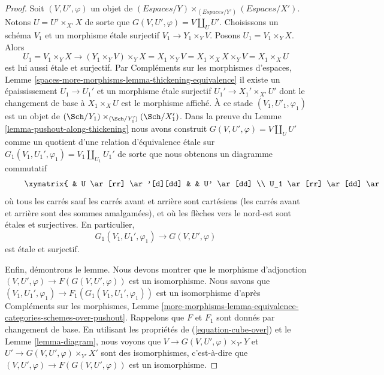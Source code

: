 \begin{proof}
\medskip\noindent
Soit $(V, U', \varphi)$ un objet de
$(\textit{Espaces}/Y) \times_{(\textit{Espaces}/Y')} (\textit{Espaces}/X')$.
Notons $U = U' \times_{X'} X$ de sorte que $G(V, U', \varphi) = V \amalg_U U'$.
Choisissons un schéma $V_1$ et un morphisme \'etale surjectif
$V_1 \to Y_1 \times_Y V$. Posons $U_1 = V_1 \times_Y X$. Alors
$$
U_1 = V_1 \times_Y X
\longrightarrow
(Y_1 \times_Y V) \times_Y X =
X_1 \times_Y V = X_1 \times_X X \times_Y V = X_1 \times_X U
$$
est lui aussi \'etale et surjectif. Par
Compléments sur les morphismes d'espaces, Lemme
\ref{spaces-more-morphisms-lemma-thickening-equivalence}
il existe un épaississement $U_1 \to U_1'$ et un morphisme \'etale surjectif
$U_1' \to X_1' \times_{X'} U'$ dont le changement de base à $X_1 \times_X U$ est le
morphisme affiché. À ce stade $(V_1, U'_1, \varphi_1)$ est un objet de
$(\Sch/Y_1) \times_{(\Sch/Y_1')} (\Sch/X_1')$. Dans la preuve du
Lemme \ref{lemma-pushout-along-thickening} nous avons construit
$G(V, U', \varphi) = V \amalg_U U'$ comme un quotient d'une relation
d'équivalence \'etale sur $G_1(V_1, U_1', \varphi_1) = V_1 \amalg_{U_1} U_1'$
de sorte que nous obtenons un diagramme commutatif
\begin{equation}
\label{equation-cube-over}
\vcenter{
\xymatrix{
& U \ar[rr] \ar'[d][dd] & & U' \ar[dd] \\
U_1 \ar[rr] \ar[dd] \ar[ru] & & U_1' \ar[dd] \ar[ru] & \\
& V \ar'[r][rr] & & G(V, U', \varphi) \\
V_1 \ar[rr] \ar[ru] & & G_1(V_1, U_1', \varphi_1) \ar[ru]
}
}
\end{equation}
où tous les carrés sauf les carrés avant et arrière sont cartésiens (les carrés avant et arrière sont des sommes amalgamées), et où les flèches vers le nord-est sont \'etales et surjectives. En particulier, $$
G_1(V_1, U_1', \varphi_1) \to G(V, U', \varphi)
$$ est \'etale et surjectif.

\medskip\noindent
Enfin, démontrons le lemme. Nous devons montrer que le morphisme d'adjonction $(V, U', \varphi) \to F(G(V, U', \varphi))$ est un isomorphisme. Nous savons que $(V_1, U_1', \varphi_1) \to F_1(G_1(V_1, U_1', \varphi_1))$ est un isomorphisme d'après Compléments sur les morphismes, Lemme \ref{more-morphisms-lemma-equivalence-categories-schemes-over-pushout}. Rappelons que $F$ et $F_1$ sont donnés par changement de base. En utilisant les propriétés de (\ref{equation-cube-over}) et le Lemme \ref{lemma-diagram}, nous voyons que $V \to G(V, U', \varphi) \times_{Y'} Y$ et $U' \to G(V, U', \varphi) \times_{Y'} X'$ sont des isomorphismes, c'est-à-dire que $(V, U', \varphi) \to F(G(V, U', \varphi))$ est un isomorphisme. 
\end{proof}


